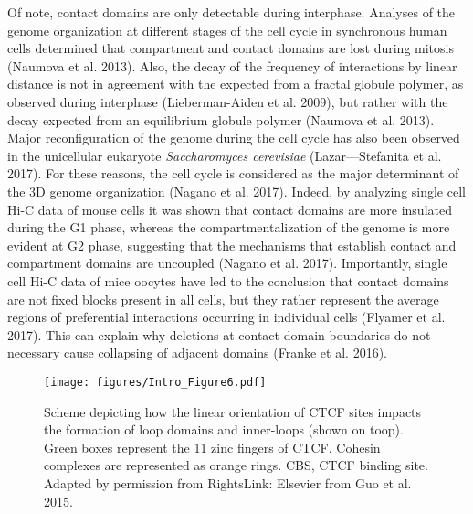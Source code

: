 Of note, contact domains are only detectable during interphase. Analyses of the genome organization at different stages of the cell cycle in synchronous human cells determined that compartment and contact domains are lost during mitosis (Naumova et al. 2013). Also, the decay of the frequency of interactions by linear distance is not in agreement with the expected from a fractal globule polymer, as observed during interphase (Lieberman-Aiden et al. 2009), but rather with the decay expected from an equilibrium globule polymer (Naumova et al. 2013). Major reconfiguration of the genome during the cell cycle has also been observed in the unicellular eukaryote \textit{Saccharomyces cerevisiae} (Lazar---Stefanita et al. 2017). For these reasons, the cell cycle is considered as the major determinant of the 3D genome organization (Nagano et al. 2017). Indeed, by analyzing single cell Hi-C data of mouse cells it was shown that contact domains are more insulated during the G1 phase, whereas the compartmentalization of the genome is more evident at G2 phase, suggesting that the mechanisms that establish contact and compartment domains are uncoupled (Nagano et al. 2017). Importantly, single cell Hi-C data of mice oocytes have led to the conclusion that contact domains are not fixed blocks present in all cells, but they rather represent the average regions of preferential interactions occurring in individual cells (Flyamer et al. 2017). This can explain why deletions at contact domain boundaries do not necessary cause collapsing of adjacent domains (Franke et al. 2016).\\


		\begin{figure}[h!]
			\centering
			\texttt{[image: figures/Intro\_Figure6.pdf]}
  			\caption[intro6]{Scheme depicting how the linear orientation of CTCF sites impacts the formation of loop domains and inner-loops (shown on toop). Green boxes represent the 11 zinc fingers of CTCF. Cohesin complexes are represented as orange rings. CBS, CTCF binding site. Adapted by permission from RightsLink: Elsevier from Guo et al. 2015.}
			\label{intro6}
		\end{figure}


